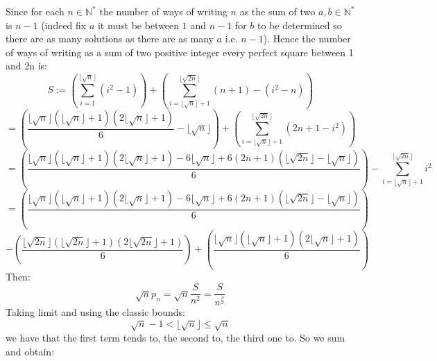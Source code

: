 \begin{solution}
    Since for each \( n\in\mathbb{N}^{*} \) the number of ways of writing \( n \) as the sum of two \( a,b\in\mathbb{N}^{*} \) is \( n-1 \) (indeed fix \( a \) it must be between \( 1 \) and \( n-1 \) for \( b \) to be determined so there are as many solutions as there are as many \( a \) i.e. \( n-1 \)). Hence the number of ways of writing as a sum of two positive integer every perfect square between 1 and 2n is:
    \[
        S:=\left(\sum_{i=1}^{\lfloor\sqrt{n}\rfloor} \left(i^2-1\right)\right) + \left(\sum_{i=\lfloor\sqrt{n}\rfloor+1}^{\lfloor\sqrt{2n}\rfloor} \left(n+1\right) -\left(i^2-n\right)\right)
    \]
    \[
        =\left(\frac{\lfloor\sqrt{n}\rfloor\left(\lfloor\sqrt{n}\rfloor+1\right)\left(2\lfloor\sqrt{n}\rfloor+1\right)}{6} - \lfloor\sqrt{n}\rfloor\right) + \left(\sum_{i=\lfloor\sqrt{n}\rfloor+1}^{\lfloor\sqrt{2n}\rfloor} \left(2n+1-i^2\right)\right)
    \]
    \[
        =\left(\frac{\lfloor\sqrt{n}\rfloor\left(\lfloor\sqrt{n}\rfloor+1\right)\left(2\lfloor\sqrt{n}\rfloor+1\right)-6\lfloor\sqrt{n}\rfloor + 6\left(2n+1\right)\left(\lfloor\sqrt{2n}\rfloor-\lfloor\sqrt{n}\rfloor\right)}{6}\right)-\sum_{i=\lfloor\sqrt{n}\rfloor + 1}^{\lfloor\sqrt{2n}\rfloor}i^2
    \]
    \[
        =\left(\frac{\lfloor\sqrt{n}\rfloor\left(\lfloor\sqrt{n}\rfloor+1\right)\left(2\lfloor\sqrt{n}\rfloor+1\right)-6\lfloor\sqrt{n}\rfloor + 6\left(2n+1\right)\left(\lfloor\sqrt{2n}\rfloor-\lfloor\sqrt{n}\rfloor\right)}{6}\right)
    \]
    \[
        - \left(\frac{\lfloor\sqrt{2n}\rfloor\left(\lfloor\sqrt{2n}\rfloor+1\right)\left(2\lfloor\sqrt{2n}\rfloor+1\right)}{6}\right)+\left(\frac{\lfloor\sqrt{n}\rfloor\left(\lfloor\sqrt{n}\rfloor+1\right)\left(2\lfloor\sqrt{n}\rfloor+1\right)}{6}\right)
    \]
    Then:
    \[
        \sqrt{n}p_n = \sqrt{n}\frac{S}{n^2}=\frac{S}{n^{\frac{3}{2}}}
    \]
    Taking limit and using the classic bounds:
    \[
        \sqrt{n}-1<\lfloor\sqrt{n}\rfloor\leq \sqrt{n}
    \]
    we have that the first term tends to, the second to, the third one to. So we sum and obtain:
\end{solution}
